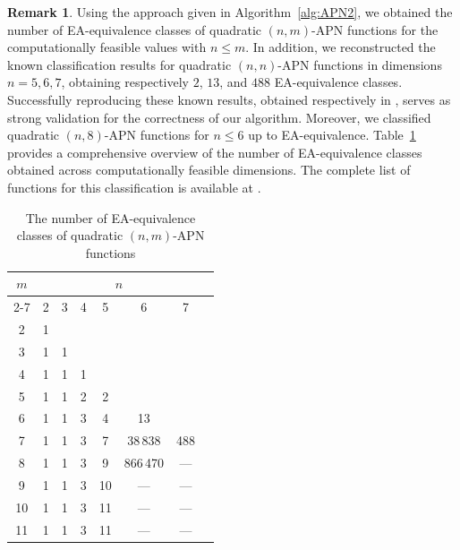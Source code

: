 \documentclass{amsart}[11pt]
\theoremstyle{plain}
\theoremstyle{definition}
\newtheorem{remark}[theorem]{Remark}
\numberwithin{theorem}{section}
\numberwithin{equation}{section}
\numberwithin{table}{section}
\numberwithin{figure}{section}
\numberwithin{algorithm}{section}
\begin{document}
\begin{remark}
    Using the approach given in Algorithm~\ref{alg:APN2}, we obtained the number of EA-equivalence classes of quadratic $(n,m)$-APN functions for the computationally feasible values with $n\leq m$.
    In addition, we reconstructed the known classification results for quadratic $(n,n)$-APN functions in dimensions $n=5,6,7$, obtaining respectively $2$, $13$, and $488$ EA-equivalence classes.
    Successfully reproducing these known results, obtained respectively in \cite{DBLP:journals/dcc/BrinkmannL08,Dillon_Banff:2006,DBLP:journals/iacr/KalginI20a}, serves as strong validation for the correctness of our algorithm.
    Moreover, we classified quadratic $(n,8)$-APN functions for $n\leq 6$ up to EA-equivalence. Table~\ref{table:number_of_classes} provides a comprehensive overview of the number of EA-equivalence classes obtained across computationally feasible dimensions.
    The complete list of functions for this classification is available at \cite{zenodo-classification}.
    \begin{table}[h!]
    	\centering
        \caption{The number of EA-equivalence classes of quadratic $(n,m)$-APN functions}
        \label{table:number_of_classes}
    	\begin{tabular}{c@{\qquad}ccccccc} \toprule
    		\multirow{2}{*}{$m$} & \multicolumn{6}{c}{$n$} \\ \cmidrule{2-7}
    		      & 2 & 3 & 4 &  5 &      6 &     7 \\ \midrule
             2  & 1 &                             \\
             3  & 1 & 1                           \\
             4  & 1 & 1 & 1                       \\
             5  & 1 & 1 & 2 &  2                  \\
             6  & 1 & 1 & 3 &  4 &       13       \\
             7  & 1 & 1 & 3 &  7 &  38\,838 & 488 \\
             8  & 1 & 1 & 3 &  9 & 866\,470 & --- \\
             9  & 1 & 1 & 3 & 10 &      --- & --- \\
            10  & 1 & 1 & 3 & 11 &      --- & --- \\
            11  & 1 & 1 & 3 & 11 &      --- & --- \\ \bottomrule
    	\end{tabular}
    \end{table}
\end{remark}
\end{document}
